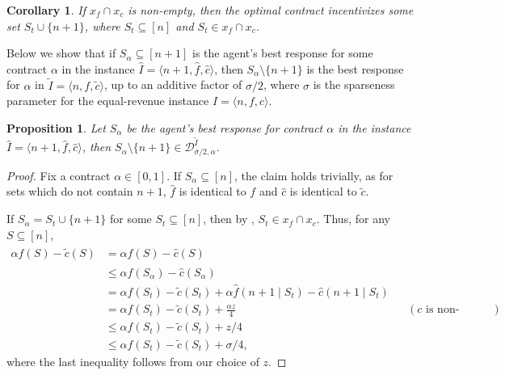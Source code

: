 \documentclass[11pt]{article}
\newtheorem{corollary}{Corollary}
\newtheorem{proposition}{Proposition}
\newcommand{\instanceI}{I=\langle n, f, c \rangle}
\newcommand{\inst}[3]{\langle #1, #2, #3 \rangle}
\newcommand{\demand}[2]{\mathcal{D}_{{#1},{#2}}}
\newcommand{\BR}[3]{\demand{#1}{#2}^{#3}}
\newcommand{\tc}{\tilde{c}}
\newcommand{\hf}{\hat{f}}
\newcommand{\hc}{\hat{c}}
\newcommand{\tI}{\tilde{I}}
\newcommand{\InstTildeI}{\tI = \inst{n}{f}{\tc}}
\newcommand{\hI}{\hat{I}}
\newcommand{\InstHatI}{\hI = \inst{n+1}{\hf}{\hc}}
\begin{document}
\begin{corollary}\label{cor:opt_set_if_non_empty_intersection}
    If $x_f \cap x_c$ is non-empty, then the optimal contract incentivizes some set $S_t \cup \{n+1\}$, where $S_t \subseteq [n]$ and $S_t \in x_f \cap x_c$. 
\end{corollary}

Below we show that if $S_\alpha \subseteq [n+1]$ is the agent's best response for some contract $\alpha$ in the instance $\InstHatI$, then $S_\alpha \setminus \{n+1\}$ is the best response for $\alpha$ in $\InstTildeI$, up to an additive factor of $\sigma/2$, where $\sigma$ is the sparseness parameter for the equal-revenue instance $\instanceI$.

\begin{proposition}\label{prop:BR_in_approxDemand_f_c_submod}
    Let $S_\alpha$ be the agent's best response for contract $\alpha$ in the instance $\InstHatI$, then 
    $S_\alpha \setminus\{n+1\} \in \BR{\sigma/2}{\alpha}{\tI}$.
\end{proposition}
\begin{proof}
Fix a contract $\alpha \in [0,1]$.
    If $S_\alpha \subseteq [n]$, the claim holds trivially, as for sets which do not contain $n+1$, $\hf$ is identical to $f$ and $\hc$ is identical to $\tc$.

     If $S_\alpha = S_t \cup \{n+1\}$ for some $S_t \subseteq [n]$, then by , $S_t \in x_f \cap x_c$.
     Thus, for any $S \subseteq [n]$,
     \begin{align*}
     \alpha f(S) - \tc(S) 
     &=
     \alpha \hf(S) - \hc(S) \\
     &\le
     \alpha \hf(S_\alpha) - \hc(S_\alpha) \\
     &=
     \alpha f(S_t) - \tc(S_t) + \alpha \hf(n+1 \mid S_t) - \hc(n+1 \mid S_t)\\
     &=
     \alpha f(S_t) - \tc(S_t) + \frac{\alpha z}{4} && (c \text{ is non-negative}) \\
     &\le
     \alpha f(S_t) - \tc(S_t) + z/4 \\
     &\le 
     \alpha f(S_t) - \tc(S_t) + \sigma/4,
     \end{align*}
     where the last inequality follows from our choice of $z$.
\end{proof}
\end{document}
